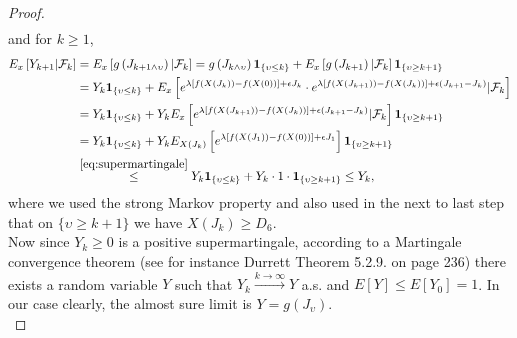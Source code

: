 \documentclass[12pt,a4paper]{scrartcl}
\numberwithin{equation}{section}
\begin{document}
\begin{proof}
\begin{align*}
\end{align*}
and for $k \geq 1$,
\begin{align*}
E_x\left[Y_{k+1} | \mathcal{F}_k \right] &= E_x\left[ g\left(J_{k+1 \wedge \upsilon} \right)  |\mathcal{F}_k \right] = g\left(J_{k \wedge \upsilon} \right) \textbf{1}_{\lbrace  \upsilon \leq k \rbrace} + E_x\left[g\left(J_{k+1} \right) |\mathcal{F}_k \right] \textbf{1}_{\lbrace \upsilon \geq k+1 \rbrace} \\
&= Y_k \textbf{1}_{\lbrace \upsilon \leq k \rbrace} + E_x\left[e^{\lambda \left[f\left(X\left(J_k \right) \right) - f\left(X\left(0\right) \right) \right] + \epsilon J_k} \cdot e^{\lambda \left[f\left(X\left(J_{k+1} \right) \right) - f\left(X\left(J_k \right) \right) \right] + \epsilon \left(J_{k+1} - J_k \right)} |\mathcal{F}_k\right] \\
&=Y_k \textbf{1}_{\lbrace \upsilon \leq k \rbrace} + Y_k E_x\left[ e^{\lambda \left[f\left(X\left(J_{k+1} \right) \right) - f\left(X\left(J_k \right) \right) \right] + \epsilon \left(J_{k+1} - J_k \right)} |\mathcal{F}_k \right] \textbf{1}_{\lbrace \upsilon \geq k+1 \rbrace} \\
&=Y_k \textbf{1}_{\lbrace \upsilon \leq k \rbrace} + Y_k E_{X\left(J_k\right)} \left[e^{\lambda\left[f\left(X\left(J_1\right) \right) - f\left(X\left(0\right) \right) \right] + \epsilon J_1 } \right] \textbf{1}_{\lbrace \upsilon \geq k+1 \rbrace} \\
& \overset{\eqref{eq:supermartingale}}{\leq} Y_k \textbf{1}_{\lbrace \upsilon \leq k \rbrace} + Y_k \cdot 1 \cdot \textbf{1}_{\lbrace \upsilon \geq k+1 \rbrace} \leq Y_k,
\end{align*}
where we used the strong Markov property and also used in the next to last step that on $\lbrace\upsilon \geq k+1\rbrace$ we have $X\left(J_k\right) \geq D_6$.\\[2ex]

Now since $Y_k \geq 0$ is a positive supermartingale, according to a Martingale convergence theorem (see for instance Durrett \cite{durrett} Theorem 5.2.9. on page 236) there exists a random variable $Y$ such that $Y_k \overset{k \to \infty}{\to} Y$ a.s. and $E\left[Y\right] \leq E\left[Y_0\right] = 1 $. In our case clearly, the almost sure limit is $Y = g\left(J_{\upsilon} \right).$ \\[2ex]


\end{proof}
\end{document}

